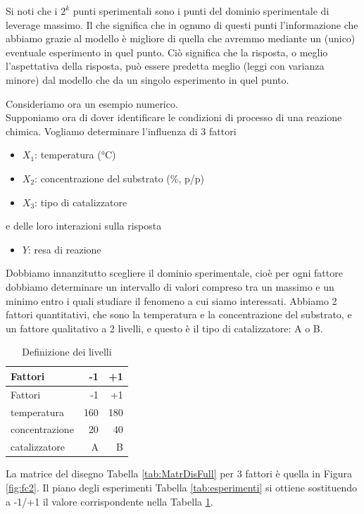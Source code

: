 \documentclass[
  11pt,
]{book}
\providecommand{\tightlist}{%
  \setlength{\itemsep}{0pt}\setlength{\parskip}{0pt}}
\begin{document}
Si noti che i \(2^k\) punti sperimentali sono i punti del dominio
sperimentale di leverage massimo. Il che significa che in ognuno di
questi punti l'informazione che abbiamo grazie al modello è migliore di
quella che avremmo mediante un (unico) eventuale esperimento in quel
punto. Ciò significa che la risposta, o meglio l'aspettativa della
risposta, può essere predetta meglio (leggi con varianza minore) dal
modello che da un singolo esperimento in quel punto. \newline

Consideriamo ora un esempio numerico.\\
Supponiamo ora di dover identificare le condizioni di processo di una
reazione chimica. Vogliamo determinare l'influenza di 3 fattori

\begin{itemize}
\item
  \(X_1\): temperatura (°C)
\item
  \(X_2\): concentrazione del substrato (\%, p/p)
\item
  \(X_3\): tipo di catalizzatore
\end{itemize}

e delle loro interazioni sulla risposta

\begin{itemize}
\tightlist
\item
  \(Y\): resa di reazione
\end{itemize}

Dobbiamo innanzitutto scegliere il dominio sperimentale, cioè per ogni
fattore dobbiamo determinare un intervallo di valori compreso tra un
massimo e un minimo entro i quali studiare il fenomeno a cui siamo
interessati. Abbiamo 2 fattori quantitativi, che sono la temperatura e
la concentrazione del substrato, e un fattore qualitativo a 2 livelli, e
questo è il tipo di catalizzatore: A o B.

\begin{longtable}[]{@{}lrr@{}}
\caption{\label{tab:livelli}Definizione dei livelli}\tabularnewline
\toprule
Fattori & -1 & +1 \\
\midrule
\endfirsthead
\toprule
Fattori & -1 & +1 \\
\midrule
\endhead
temperatura & 160 & 180 \\
concentrazione & 20 & 40 \\
catalizzatore & A & B \\
\bottomrule
\end{longtable}

La matrice del disegno Tabella \ref{tab:MatrDisFull} per 3 fattori è quella in Figura \ref{fig:fc2}. Il piano degli esperimenti Tabella \ref{tab:esperimenti} si
ottiene sostituendo a -1/+1 il valore corrispondente nella Tabella
\ref{tab:livelli}. \newpage
\end{document}
